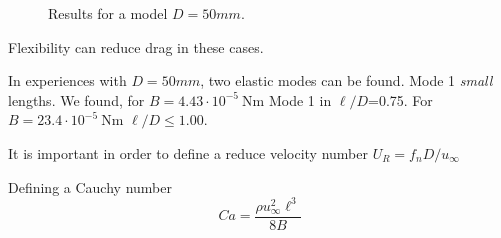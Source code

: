 \documentclass[10pt,fleqn,a4paper,twoside]{article}
\begin{document}
%	
	\begin{figure}		
	\begin{subfigure}[t]{.5\textwidth}
		\centering{} 	\label{fig:B043}
	\end{subfigure}
	\begin{subfigure}[t]{.5\textwidth}
	\centering{} \label{fig:B234}
\end{subfigure}	


\caption{Results for a model $D = 50mm$.}

\end{figure}
Flexibility can reduce drag in these cases.

In experiences with $D=50mm$, two elastic modes can be found. Mode 1 \textit{small} lengths. 
We found, for $B=4.43\cdot10^{-5}\SI{}{\newton\meter}$ Mode 1 in $\ell/D$=0.75. For $B=23.4\cdot10^{-5}\SI{}{\newton\meter}$
 $\ell/D\le 1.00$. 
 
 It is important in order to define a reduce velocity number $U_R = f_n D / u_\infty$
 
 Defining a Cauchy number
 $$Ca = \frac{\rho u_\infty^2\ell^3}{8B}$$
 
 
 
 
\end{document}
